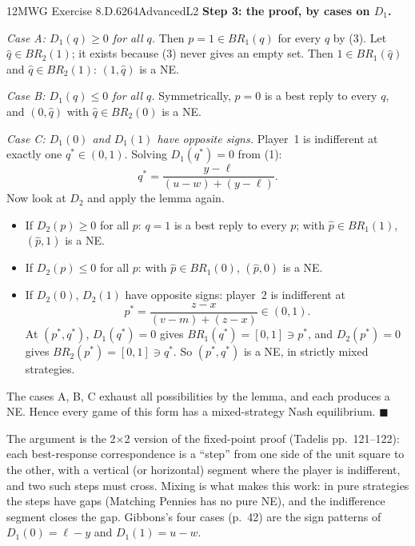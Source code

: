 \begin{exsol}{12}{MWG Exercise 8.D.6}{264}{Advanced}{L2}
\textbf{Step 3: the proof, by cases on $D_1$.}

\emph{Case A: $D_1(q) \ge 0$ for all $q$.} Then $p = 1 \in BR_1(q)$ for every $q$ by (3). Let
$\hat q \in BR_2(1)$; it exists because (3) never gives an empty set. Then $1 \in BR_1(\hat q)$
and $\hat q \in BR_2(1)$: $(1, \hat q)$ is a NE.

\emph{Case B: $D_1(q) \le 0$ for all $q$.} Symmetrically, $p = 0$ is a best reply to every $q$,
and $(0, \hat q)$ with $\hat q \in BR_2(0)$ is a NE.

\emph{Case C: $D_1(0)$ and $D_1(1)$ have opposite signs.} Player~1 is indifferent at exactly one
$q^* \in (0,1)$. Solving $D_1(q^*) = 0$ from (1):
\[
  q^* = \frac{y - \ell}{(u - w) + (y - \ell)} . \tag{4}
\]
Now look at $D_2$ and apply the lemma again.
\begin{itemize}
  \item If $D_2(p) \ge 0$ for all $p$: $q = 1$ is a best reply to every $p$; with
  $\hat p \in BR_1(1)$, $(\hat p, 1)$ is a NE.
  \item If $D_2(p) \le 0$ for all $p$: with $\hat p \in BR_1(0)$, $(\hat p, 0)$ is a NE.
  \item If $D_2(0)$, $D_2(1)$ have opposite signs: player~2 is indifferent at
  \[
    p^* = \frac{z - x}{(v - m) + (z - x)} \in (0,1). \tag{5}
  \]
  At $(p^*, q^*)$, $D_1(q^*) = 0$ gives $BR_1(q^*) = [0,1] \ni p^*$, and $D_2(p^*) = 0$ gives
  $BR_2(p^*) = [0,1] \ni q^*$. So $(p^*, q^*)$ is a NE, in strictly mixed strategies.
\end{itemize}
The cases A, B, C exhaust all possibilities by the lemma, and each produces a NE. Hence every game
of this form has a mixed-strategy Nash equilibrium. $\blacksquare$

\interp The argument is the 2$\times$2 version of the fixed-point proof (Tadelis
pp.~121--122): each best-response correspondence is a ``step'' from one side of the unit square to
the other, with a vertical (or horizontal) segment where the player is indifferent, and two such
steps must cross. Mixing is what makes this work: in pure strategies the steps have gaps (Matching
Pennies has no pure NE), and the indifference segment closes the gap. Gibbons's four cases
(p.~42) are the sign patterns of $D_1(0) = \ell - y$ and $D_1(1) = u - w$.


\end{exsol}
